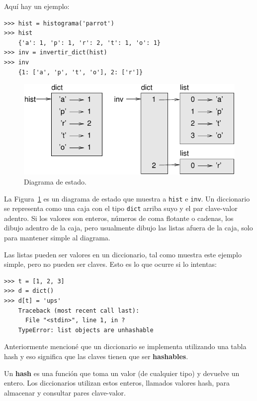 \documentclass[10pt]{book}
\begin{document}
Aquí hay un ejemplo:

\begin{verbatim}
>>> hist = histograma('parrot')
>>> hist
    {'a': 1, 'p': 1, 'r': 2, 't': 1, 'o': 1}
>>> inv = invertir_dict(hist)
>>> inv
    {1: ['a', 'p', 't', 'o'], 2: ['r']}
\end{verbatim}

\begin{figure}
\centerline
{\includegraphics[scale=0.8]{figs/dict1.pdf}}
\caption{Diagrama de estado.}
\label{fig.dict1}
\end{figure}

La Figura~\ref{fig.dict1} es un diagrama de estado que muestra a {\tt hist} e {\tt inv}.
Un diccionario se representa como una caja con el tipo {\tt dict} arriba suyo
y el par clave-valor adentro.  Si los valores son enteros, números de coma flotante o
cadenas, los dibujo adentro de la caja, pero usualmente dibujo las listas
afuera de la caja, solo para mantener simple al diagrama.

Las listas pueden ser valores en un diccionario, tal como muestra este ejemplo simple, pero
no pueden ser claves.  Esto es lo que ocurre si lo intentas:


\begin{verbatim}
>>> t = [1, 2, 3]
>>> d = dict()
>>> d[t] = 'ups'
    Traceback (most recent call last):
      File "<stdin>", line 1, in ?
    TypeError: list objects are unhashable
\end{verbatim}
%
Anteriormente mencioné que un diccionario se implementa utilizando
una tabla hash y eso significa que las claves tienen que ser {\bf hashables}.

Un {\bf hash} es una función que toma un valor (de cualquier tipo)
y devuelve un entero.  Los diccionarios utilizan estos enteros,
llamados valores hash, para almacenar y consultar pares clave-valor.
\end{document}
